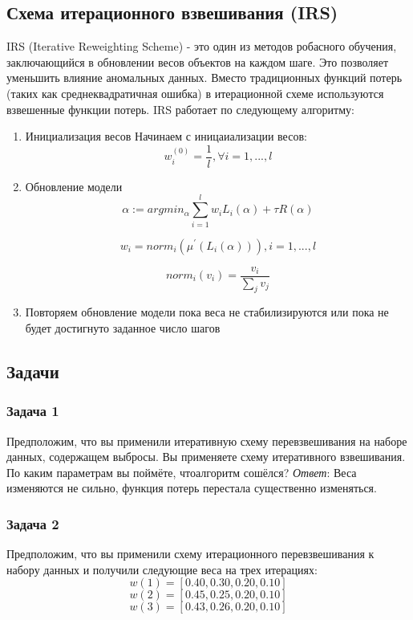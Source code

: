 \subsection{Схема итерационного взвешивания (IRS)}
IRS (Iterative Reweighting Scheme) - это один из
методов робасного обучения, заключающийся в обновлении весов объектов на каждом
шаге. Это позволяет уменьшить влияние аномальных данных. Вместо традиционных
функций потерь (таких как среднеквадратичная ошибка) в итерационной схеме
используются взвешенные функции потерь. IRS работает по следующему алгоритму:

\begin{enumerate}
    \item Инициализация весов
          Начинаем с иницаиализации весов:
          \[w_i^{(0)} = \frac{1}{l}, \forall i = 1, ..., l\]
    \item Обновление модели
          \[\alpha := arg min_{\alpha} \sum_{i=1}^l w_i L_i\left(\alpha\right) + \tau R\left(\alpha\right)\]

          \[w_i = norm_i\left( \mu^{'}\left( L_i(\alpha) \right) \right), i = 1, ..., l\]

          \[norm_i(v_i) = \frac{v_i}{\sum_j v_j}\]
    \item Повторяем обновление модели пока веса не стабилизируются или пока не
          будет достигнуто заданное число шагов
\end{enumerate}

\subsection{Задачи}
\subsubsection{Задача 1}
Предположим, что вы применили итеративную схему перевзвешивания на наборе
данных, содержащем выбросы. Вы применяете схему итеративного взвешивания.
По каким параметрам вы поймёте, чтоалгоритм сошёлся?
\textit{Ответ}: Веса изменяются не сильно, функция потерь перестала существенно
изменяться.
\subsubsection{Задача 2}
Предположим, что вы применили схему итерационного перевзвешивания к набору
данных и получили следующие веса на трех итерациях:
\[ w(1) = [0.40, 0.30, 0.20, 0.10] \]
\[ w(2) = [0.45, 0.25, 0.20 ,0.10] \]
\[ w(3) = [0.43, 0.26, 0.20, 0.10] \]


